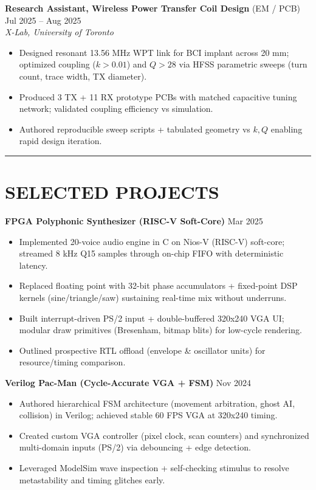 \documentclass[letterpaper,10pt]{article}
\begin{document}
\vspace{0.15cm}
\textbf{Research Assistant, Wireless Power Transfer Coil Design} (EM / PCB) \hfill Jul 2025 -- Aug 2025\\
\textit{X-Lab, University of Toronto}
\begin{itemize}[leftmargin=0.2in]
    \item Designed resonant 13.56 MHz WPT link for BCI implant across 20 mm; optimized coupling ($k > 0.01$) and $Q > 28$ via HFSS parametric sweeps (turn count, trace width, TX diameter).
    \item Produced 3 TX + 11 RX prototype PCBs with matched capacitive tuning network; validated coupling efficiency vs simulation.
    \item Authored reproducible sweep scripts + tabulated geometry vs $k, Q$ enabling rapid design iteration.
\end{itemize}

\noindent\rule{\linewidth}{1pt}

\section*{\textbf{SELECTED PROJECTS}}
\textbf{FPGA Polyphonic Synthesizer (RISC-V Soft-Core)} \hfill Mar 2025\\
\begin{itemize}[leftmargin=0.2in]
    \item Implemented 20-voice audio engine in C on Nios-V (RISC-V) soft-core; streamed 8 kHz Q15 samples through on-chip FIFO with deterministic latency.
    \item Replaced floating point with 32-bit phase accumulators + fixed-point DSP kernels (sine/triangle/saw) sustaining real-time mix without underruns.
    \item Built interrupt-driven PS/2 input + double-buffered 320x240 VGA UI; modular draw primitives (Bresenham, bitmap blits) for low-cycle rendering.
    \item Outlined prospective RTL offload (envelope \& oscillator units) for resource/timing comparison.
\end{itemize}

\textbf{Verilog Pac-Man (Cycle-Accurate VGA + FSM)} \hfill Nov 2024\\
\begin{itemize}[leftmargin=0.2in]
    \item Authored hierarchical FSM architecture (movement arbitration, ghost AI, collision) in Verilog; achieved stable 60 FPS VGA at 320x240 timing.
    \item Created custom VGA controller (pixel clock, scan counters) and synchronized multi-domain inputs (PS/2) via debouncing + edge detection.
    \item Leveraged ModelSim wave inspection + self-checking stimulus to resolve metastability and timing glitches early.
\end{itemize}
\end{document}
